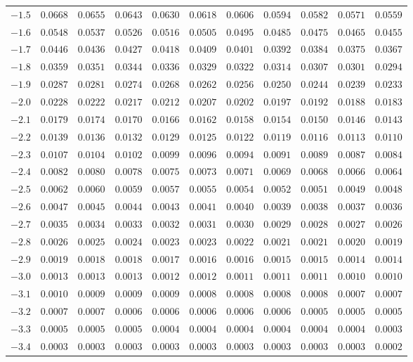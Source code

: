 \documentclass[11pt]{article}
\begin{document}
\begin{tabular}{c*{10}{r}}
$-1.5$ & $0.0668$ & $0.0655$ & $0.0643$ & $0.0630$ & $0.0618$ & $0.0606$ & $0.0594$ & $0.0582$ & $0.0571$ & $0.0559$ \\
$-1.6$ & $0.0548$ & $0.0537$ & $0.0526$ & $0.0516$ & $0.0505$ & $0.0495$ & $0.0485$ & $0.0475$ & $0.0465$ & $0.0455$ \\
$-1.7$ & $0.0446$ & $0.0436$ & $0.0427$ & $0.0418$ & $0.0409$ & $0.0401$ & $0.0392$ & $0.0384$ & $0.0375$ & $0.0367$ \\
$-1.8$ & $0.0359$ & $0.0351$ & $0.0344$ & $0.0336$ & $0.0329$ & $0.0322$ & $0.0314$ & $0.0307$ & $0.0301$ & $0.0294$ \\
$-1.9$ & $0.0287$ & $0.0281$ & $0.0274$ & $0.0268$ & $0.0262$ & $0.0256$ & $0.0250$ & $0.0244$ & $0.0239$ & $0.0233$ \\
$-2.0$ & $0.0228$ & $0.0222$ & $0.0217$ & $0.0212$ & $0.0207$ & $0.0202$ & $0.0197$ & $0.0192$ & $0.0188$ & $0.0183$ \\
$-2.1$ & $0.0179$ & $0.0174$ & $0.0170$ & $0.0166$ & $0.0162$ & $0.0158$ & $0.0154$ & $0.0150$ & $0.0146$ & $0.0143$ \\
$-2.2$ & $0.0139$ & $0.0136$ & $0.0132$ & $0.0129$ & $0.0125$ & $0.0122$ & $0.0119$ & $0.0116$ & $0.0113$ & $0.0110$ \\
$-2.3$ & $0.0107$ & $0.0104$ & $0.0102$ & $0.0099$ & $0.0096$ & $0.0094$ & $0.0091$ & $0.0089$ & $0.0087$ & $0.0084$ \\
$-2.4$ & $0.0082$ & $0.0080$ & $0.0078$ & $0.0075$ & $0.0073$ & $0.0071$ & $0.0069$ & $0.0068$ & $0.0066$ & $0.0064$ \\
$-2.5$ & $0.0062$ & $0.0060$ & $0.0059$ & $0.0057$ & $0.0055$ & $0.0054$ & $0.0052$ & $0.0051$ & $0.0049$ & $0.0048$ \\
$-2.6$ & $0.0047$ & $0.0045$ & $0.0044$ & $0.0043$ & $0.0041$ & $0.0040$ & $0.0039$ & $0.0038$ & $0.0037$ & $0.0036$ \\
$-2.7$ & $0.0035$ & $0.0034$ & $0.0033$ & $0.0032$ & $0.0031$ & $0.0030$ & $0.0029$ & $0.0028$ & $0.0027$ & $0.0026$ \\
$-2.8$ & $0.0026$ & $0.0025$ & $0.0024$ & $0.0023$ & $0.0023$ & $0.0022$ & $0.0021$ & $0.0021$ & $0.0020$ & $0.0019$ \\
$-2.9$ & $0.0019$ & $0.0018$ & $0.0018$ & $0.0017$ & $0.0016$ & $0.0016$ & $0.0015$ & $0.0015$ & $0.0014$ & $0.0014$ \\
$-3.0$ & $0.0013$ & $0.0013$ & $0.0013$ & $0.0012$ & $0.0012$ & $0.0011$ & $0.0011$ & $0.0011$ & $0.0010$ & $0.0010$ \\
$-3.1$ & $0.0010$ & $0.0009$ & $0.0009$ & $0.0009$ & $0.0008$ & $0.0008$ & $0.0008$ & $0.0008$ & $0.0007$ & $0.0007$ \\
$-3.2$ & $0.0007$ & $0.0007$ & $0.0006$ & $0.0006$ & $0.0006$ & $0.0006$ & $0.0006$ & $0.0005$ & $0.0005$ & $0.0005$ \\
$-3.3$ & $0.0005$ & $0.0005$ & $0.0005$ & $0.0004$ & $0.0004$ & $0.0004$ & $0.0004$ & $0.0004$ & $0.0004$ & $0.0003$ \\
$-3.4$ & $0.0003$ & $0.0003$ & $0.0003$ & $0.0003$ & $0.0003$ & $0.0003$ & $0.0003$ & $0.0003$ & $0.0003$ & $0.0002$ \\
\bottomrule
\end{tabular}
\normalsize
\end{document}
